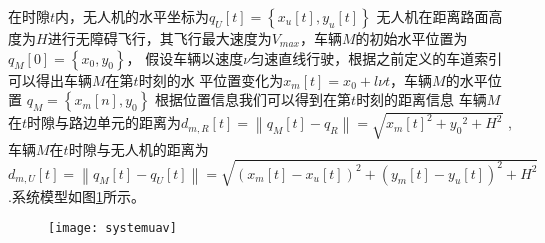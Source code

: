 在时隙$t$内，无人机的水平坐标为$q_U\left[t\right]=\left\{x_u\left[t\right],y_u\left[t\right]\right\}$
无人机在距离路面高度为$H$进行无障碍飞行，其飞行最大速度为$V_{max}$，车辆$M$的初始水平位置为$q_M\left[0\right]=\left\{x_0,y_0\right\}$，
假设车辆以速度$\nu$匀速直线行驶，根据之前定义的车道索引可以得出车辆$M$在第$t$时刻的水
平位置变化为$x_m\left[t\right]=x_0+l\nu t$，车辆$M$的水平位置 $q_M=\left\{x_m\left[n\right],y_0\right\}$
根据位置信息我们可以得到在第$t$时刻的距离信息
车辆$M$在$t$时隙与路边单元的距离为${{d}_{m,R}}\left[ t \right]=\left\| {{q}_{M}}\left[ t \right]-{{q}_{R}} \right\|=\sqrt{{{x}_{m}}{{\left[ t \right]}^{2}}+{{y}_{0}}^{2}+{{H}^{2}}}$
,车辆$M$在$t$时隙与无人机的距离为
$
{{d}_{m,U}}\left[ t \right]=\left\| {{q}_{M}}\left[ t \right]-{{q}_{U}}\left[ t \right] \right\|=\sqrt{{{\left( {{x}_{m}}\left[ t \right]-{{x}_{u}}\left[ t \right] \right)}^{2}}+{{\left( {{y}_{m}}\left[ t \right]-{{y}_{u}}\left[ t \right] \right)}^{2}}+{{H}^{2}}}\
$.系统模型如图\ref{systemuav}所示。
\begin{figure}[hptb!]
 \centering\small
 \texttt{[image: systemuav]}
 \label{systemuav}
\end{figure}

